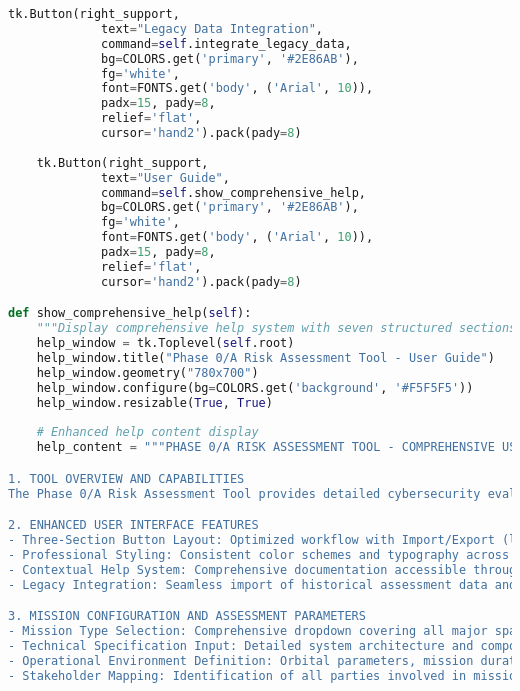 \documentclass[binding=0.6cm]{sapthesis}
\begin{document}
\begin{lstlisting}[language=Python, caption=Phase 0/A Tool Enhanced Interface Layout]
    tk.Button(right_support, 
             text="Legacy Data Integration",
             command=self.integrate_legacy_data,
             bg=COLORS.get('primary', '#2E86AB'),
             fg='white',
             font=FONTS.get('body', ('Arial', 10)),
             padx=15, pady=8,
             relief='flat',
             cursor='hand2').pack(pady=8)
    
    tk.Button(right_support, 
             text="User Guide",
             command=self.show_comprehensive_help,
             bg=COLORS.get('primary', '#2E86AB'),
             fg='white',
             font=FONTS.get('body', ('Arial', 10)),
             padx=15, pady=8,
             relief='flat',
             cursor='hand2').pack(pady=8)

def show_comprehensive_help(self):
    """Display comprehensive help system with seven structured sections"""
    help_window = tk.Toplevel(self.root)
    help_window.title("Phase 0/A Risk Assessment Tool - User Guide")
    help_window.geometry("780x700")
    help_window.configure(bg=COLORS.get('background', '#F5F5F5'))
    help_window.resizable(True, True)
    
    # Enhanced help content display
    help_content = """PHASE 0/A RISK ASSESSMENT TOOL - COMPREHENSIVE USER GUIDE

1. TOOL OVERVIEW AND CAPABILITIES
The Phase 0/A Risk Assessment Tool provides detailed cybersecurity evaluation during the preliminary design phase of space projects. It builds upon BID phase findings to deliver comprehensive threat analysis and risk assessment for system elements and design concepts.

2. ENHANCED USER INTERFACE FEATURES
- Three-Section Button Layout: Optimized workflow with Import/Export (left), Main Analysis (center), and Support (right)
- Professional Styling: Consistent color schemes and typography across all interface elements
- Contextual Help System: Comprehensive documentation accessible through integrated help functionality
- Legacy Integration: Seamless import of historical assessment data and organizational knowledge bases

3. MISSION CONFIGURATION AND ASSESSMENT PARAMETERS
- Mission Type Selection: Comprehensive dropdown covering all major space mission categories
- Technical Specification Input: Detailed system architecture and component information
- Operational Environment Definition: Orbital parameters, mission duration, and operational constraints
- Stakeholder Mapping: Identification of all parties involved in mission execution and oversight


\end{lstlisting}
\end{document}
